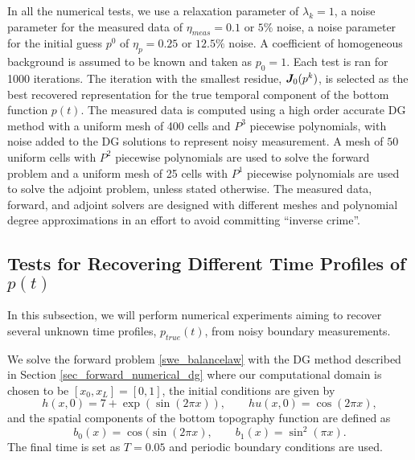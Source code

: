 In all the numerical tests, we use a relaxation parameter of $\lambda_k = 1$, a noise parameter for the measured data of $\eta_{meas}=0.1$ or $5\%$ noise, a noise parameter for the initial guess $p^0$ of $\eta_p=0.25$ or $12.5\%$ noise. A coefficient of homogeneous background is assumed to be known and taken as $p_0=1$. Each test is ran for 1000 iterations. The iteration with the smallest residue, $\bm{J}_0(p^k)$, is selected as the best recovered representation for the true temporal component of the bottom function $p(t)$. The measured data is computed using a high order accurate DG method with a uniform mesh of 400 cells and $P^3$ piecewise polynomials, with noise added to the DG solutions to represent noisy measurement.
A mesh of $50$ uniform cells with $P^{2}$ piecewise polynomials are used to solve the forward problem and a uniform mesh of 25 cells with $P^{1}$ piecewise polynomials are used to solve the adjoint problem, unless stated otherwise. The measured data, forward, and adjoint solvers are designed with different meshes and polynomial degree approximations in an effort to avoid committing ``inverse crime''\cite{Wirgin2004TheCrime}.  

\subsection{Tests for Recovering Different Time Profiles of \texorpdfstring{$p(t)$}{p(t)}} \label{sec_test_swe_1}
In this subsection, we will perform numerical experiments aiming to recover several unknown time profiles, $p_{true}(t)$, from noisy boundary measurements. 

We solve the forward problem \eqref{swe_balancelaw} with the DG method described in Section \ref{sec_forward_numerical_dg} where our computational domain is chosen to be $[x_0,x_L]=[0,1]$, the initial conditions are given by
\begin{equation} \label{ics_swe_smooth0}
    h(x,0) = 7 + \exp(\sin(2\pi x)), 
    \quad\quad 
    hu(x,0) = \cos(2 \pi x),
\end{equation}
and the spatial components of the bottom topography function are defined as
\begin{equation}\label{bvals_swe_smooth0}
    b_0(x) = \cos(\sin(2 \pi x), 
    \quad\quad 
    b_1(x) = \sin^2\left(\pi x\right).
\end{equation}
The final time is set as $T=0.05$ and periodic boundary conditions are used. 

